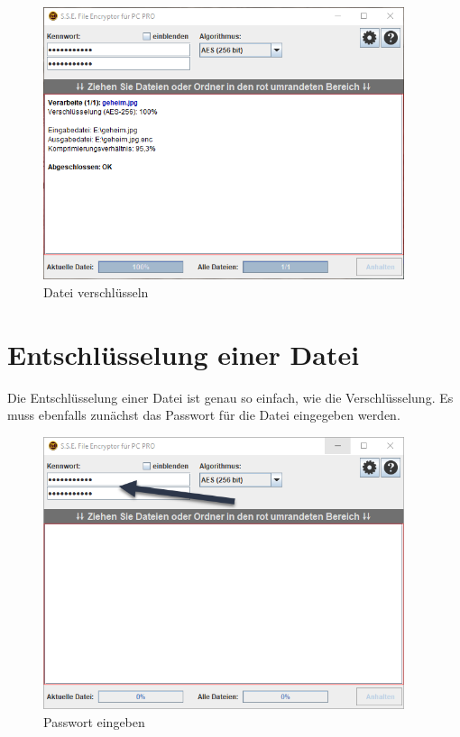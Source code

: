 \documentclass[12pt,a4paper]{scrreprt}
\begin{document}
\begin{figure}[h]
\begin{center}
\includegraphics[width=300pt]{media/sse2.png}
\caption{Datei verschlüsseln}
\label{sse2}
\end{center}
\end{figure}

\newpage

\section{Entschlüsselung einer Datei}
Die Entschlüsselung einer Datei ist genau so einfach, wie die Verschlüsselung. Es muss ebenfalls zunächst das Passwort für die Datei eingegeben werden.

\begin{figure}[h]
\begin{center}
\includegraphics[width=300pt]{media/sse1.png}
\caption{Passwort eingeben}
\label{sse12}
\end{center}
\end{figure}
\end{document}
